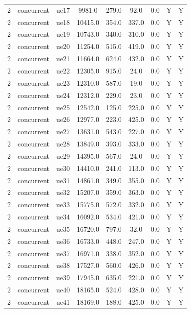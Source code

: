 \begin{table}[ht]
\begin{tabular}{|c|c|c|c|c|c|c|c|c|}
2 & concurrent & ue17 & 9981.0 & 279.0 & 92.0 & 0.0 & Y & Y \\
2 & concurrent & ue18 & 10415.0 & 354.0 & 337.0 & 0.0 & Y & Y \\
2 & concurrent & ue19 & 10743.0 & 340.0 & 310.0 & 0.0 & Y & Y \\
2 & concurrent & ue20 & 11254.0 & 515.0 & 419.0 & 0.0 & Y & Y \\
2 & concurrent & ue21 & 11664.0 & 624.0 & 432.0 & 0.0 & Y & Y \\
2 & concurrent & ue22 & 12305.0 & 915.0 & 24.0 & 0.0 & Y & Y \\
2 & concurrent & ue23 & 12310.0 & 587.0 & 19.0 & 0.0 & Y & Y \\
2 & concurrent & ue24 & 12312.0 & 229.0 & 23.0 & 0.0 & Y & Y \\
2 & concurrent & ue25 & 12542.0 & 125.0 & 225.0 & 0.0 & Y & Y \\
2 & concurrent & ue26 & 12977.0 & 223.0 & 425.0 & 0.0 & Y & Y \\
2 & concurrent & ue27 & 13631.0 & 543.0 & 227.0 & 0.0 & Y & Y \\
2 & concurrent & ue28 & 13849.0 & 393.0 & 333.0 & 0.0 & Y & Y \\
2 & concurrent & ue29 & 14395.0 & 567.0 & 24.0 & 0.0 & Y & Y \\
2 & concurrent & ue30 & 14410.0 & 241.0 & 113.0 & 0.0 & Y & Y \\
2 & concurrent & ue31 & 14861.0 & 349.0 & 355.0 & 0.0 & Y & Y \\
2 & concurrent & ue32 & 15207.0 & 359.0 & 363.0 & 0.0 & Y & Y \\
2 & concurrent & ue33 & 15775.0 & 572.0 & 332.0 & 0.0 & Y & Y \\
2 & concurrent & ue34 & 16092.0 & 534.0 & 421.0 & 0.0 & Y & Y \\
2 & concurrent & ue35 & 16720.0 & 797.0 & 32.0 & 0.0 & Y & Y \\
2 & concurrent & ue36 & 16733.0 & 448.0 & 247.0 & 0.0 & Y & Y \\
2 & concurrent & ue37 & 16971.0 & 338.0 & 352.0 & 0.0 & Y & Y \\
2 & concurrent & ue38 & 17527.0 & 560.0 & 426.0 & 0.0 & Y & Y \\
2 & concurrent & ue39 & 17945.0 & 635.0 & 221.0 & 0.0 & Y & Y \\
2 & concurrent & ue40 & 18165.0 & 524.0 & 428.0 & 0.0 & Y & Y \\
2 & concurrent & ue41 & 18169.0 & 188.0 & 425.0 & 0.0 & Y & Y \\

\end{tabular}
\end{table}
